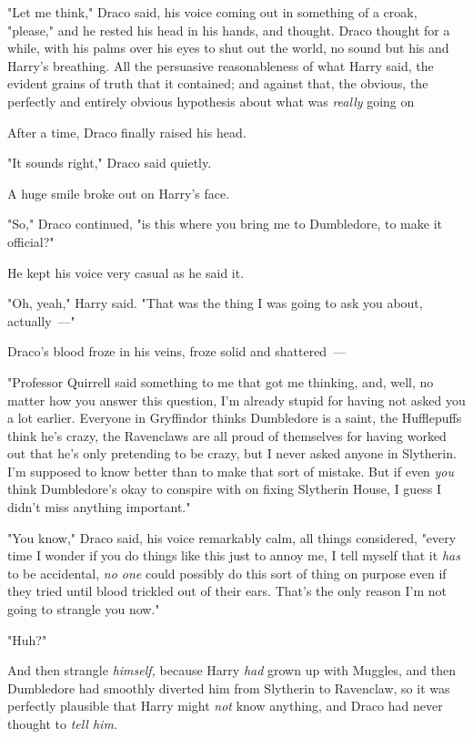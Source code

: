"Let me think," Draco said, his voice coming out in something of a croak,
"please," and he rested his head in his hands, and thought.
\sbreak
Draco thought for a while, with his palms over his eyes to shut out the world,
no sound but his and Harry's breathing. All the persuasive reasonableness of
what Harry said, the evident grains of truth that it contained; and against
that, the obvious, the perfectly and entirely obvious hypothesis about what was
\emph{really} going on{\el}

After a time, Draco finally raised his head.

"It sounds right," Draco said quietly.

A huge smile broke out on Harry's face.

"So," Draco continued, "is this where you bring me to Dumbledore, to make it
official?"

He kept his voice very casual as he said it.

"Oh, yeah," Harry said. "That was the thing I was going to ask you about,
actually~---"

Draco's blood froze in his veins, froze solid and shattered~---

"Professor Quirrell said something to me that got me thinking, and, well, no
matter how you answer this question, I'm already stupid for having not asked
you a lot earlier. Everyone in Gryffindor thinks Dumbledore is a saint, the
Hufflepuffs think he's crazy, the Ravenclaws are all proud of themselves for
having worked out that he's only pretending to be crazy, but I never asked
anyone in Slytherin. I'm supposed to know better than to make that sort of
mistake. But if even \emph{you} think Dumbledore's okay to conspire with on
fixing Slytherin House, I guess I didn't miss anything important."

{\el}

{\el}

{\el}

"You know," Draco said, his voice remarkably calm, all things considered,
"every time I wonder if you do things like this just to annoy me, I tell myself
that it \emph{has} to be accidental, \emph{no one} could possibly do this sort
of thing on purpose even if they tried until blood trickled out of their ears.
That's the only reason I'm not going to strangle you now."

"Huh?"

And then strangle \emph{himself,} because Harry \emph{had} grown up with
Muggles, and then Dumbledore had smoothly diverted him from Slytherin to
Ravenclaw, so it was perfectly plausible that Harry might \emph{not} know
anything, and Draco had never thought to \emph{tell him.}

